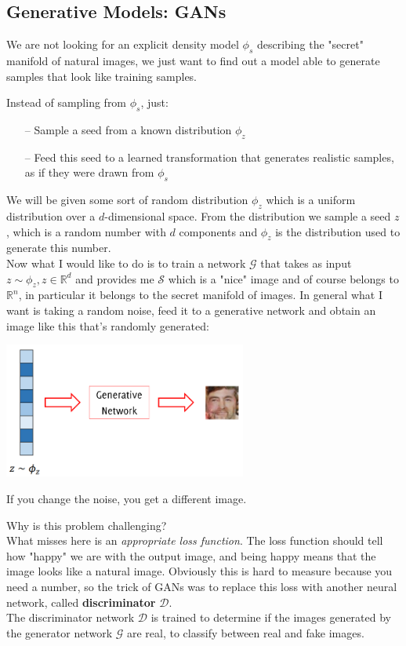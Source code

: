 \subsection{Generative Models: GANs}
We are not looking for an explicit density model $\phi_{s}$ describing the "secret" manifold of natural images, we just want to find out a model able to generate samples that look like training samples.

Instead of sampling from $\phi_{s}$, just:
\begin{itemize}
    \item[--] Sample a seed from a known distribution $\phi_{z}$
    \item[--] Feed this seed to a learned transformation that generates realistic samples, as if they were drawn from $\phi_{s}$
\end{itemize}{}
We will be given some sort of random distribution $\phi_{z}$ which is a uniform distribution over a $d$-dimensional space. From the distribution we sample a seed $z$, which is a random number with $d$ components and $\phi_z$ is the distribution used to generate this number.\\
Now what I would like to do is to train a network $\mathcal{G}$ that takes as input $z \sim \phi_{z}, z \in \mathbb{R}^{d}$ and provides me $\mathcal{S}$ which is a "nice" image and of course belongs to $\mathbb{R}^{n}$, in particular it belongs to the secret manifold of images. In general what I want is taking a random noise, feed it to a generative network and obtain an image like this that's randomly generated:
\begin{center}
    \includegraphics[width=0.6\textwidth]{images/gan_vecchio.PNG}\par
\end{center}
If you change the noise, you get a different image. 

Why is this problem challenging?\\
What misses here is an \textit{appropriate loss function}. The loss function should tell how "happy" we are with the output image, and being happy means that the image looks like a natural image. Obviously this is hard to measure because you need a number, so the trick of GANs was to replace this loss with another neural network, called \textbf{discriminator} $\mathcal{D}$.\\
The discriminator network $\mathcal{D}$ is trained to determine if the images generated by the generator network $\mathcal{G}$ are real, to classify between real and fake images. 


